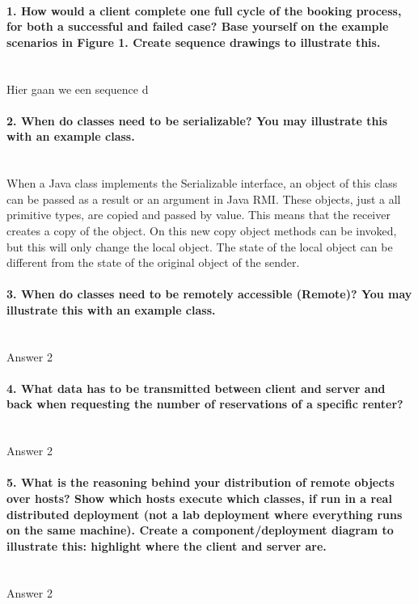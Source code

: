 \documentclass{ds-report}
\begin{document}
	\maketitle

	\paragraph{1. How would a client complete one full cycle of the booking process, for both a successful and
failed case? Base yourself on the example scenarios in Figure 1. Create sequence drawings to
illustrate this.} \mbox{}\\
	Hier gaan we een sequence d
	
	\paragraph{2. When do classes need to be serializable? You may illustrate this with an example class.} \mbox{}\\
When a Java class implements the Serializable interface, an object of this class can be passed as a result or an argument in Java RMI. These objects, just a all primitive types, are copied and passed by value. This means that the receiver creates a copy of the object. On this new copy object methods can be invoked, but this will only change the local object. The state of the local object can be different from the state of the original object of the sender.

	\paragraph{3. When do classes need to be remotely accessible (Remote)? You may illustrate this with an example
class.} \mbox{}\\
	Answer 2

	\paragraph{4. What data has to be transmitted between client and server and back when requesting the number
of reservations of a specific renter?} \mbox{}\\
	Answer 2

	\paragraph{5. What is the reasoning behind your distribution of remote objects over hosts? Show which
hosts execute which classes, if run in a real distributed deployment (not a lab deployment where
everything runs on the same machine). Create a component/deployment diagram to illustrate this:
highlight where the client and server are.} \mbox{}\\
	Answer 2
\end{document}

